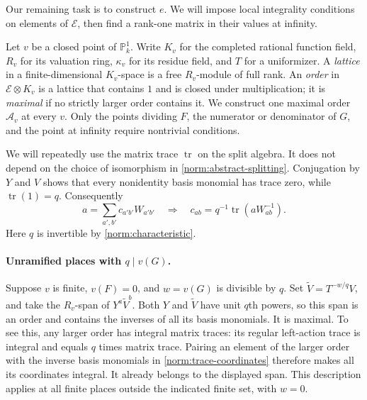 Our remaining task is to construct $e$.  We will impose local
integrality conditions on elements of $\mathcal E$, then find a
rank-one matrix in their values at infinity.

Let $v$ be a closed point of $\mathbb P^1_k$.  Write $K_v$ for the
completed rational function field, $R_v$ for its valuation ring,
$\kappa_v$ for its residue field, and $T$ for a uniformizer.  A
\emph{lattice} in a finite-dimensional $K_v$-space is a free $R_v$-module
of full rank.  An \emph{order} in $\mathcal E\otimes K_v$ is a lattice
that contains $1$ and is closed under multiplication; it is
\emph{maximal} if no strictly larger order contains it.  We construct
one maximal order $\mathcal A_v$ at every $v$.  Only the points dividing
$F$, the numerator or denominator of $G$, and the point at infinity
require nontrivial conditions.

We will repeatedly use the matrix trace $\operatorname{tr}$ on the
split algebra.  It does not depend on the choice of isomorphism in
\eqref{norm:abstract-splitting}.  Conjugation by $Y$ and $V$ shows that
every nonidentity basis monomial has trace zero, while
$\operatorname{tr}(1)=q$.  Consequently
\begin{equation}\label{norm:trace-coordinates}
 a=\sum_{a',b'} c_{a'b'}W_{a'b'}
 \quad\Longrightarrow\quad
 c_{ab}=q^{-1}\operatorname{tr}(aW_{ab}^{-1}).
\end{equation}
Here $q$ is invertible by \eqref{norm:characteristic}.

\paragraph{Unramified places with $q\mid v(G)$.}
Suppose $v$ is finite, $v(F)=0$, and $w=v(G)$ is divisible by $q$.
Set $\widetilde V=T^{-w/q}V$, and take the $R_v$-span of
$Y^a\widetilde V^b$.  Both $Y$ and $\widetilde V$ have unit $q$th
powers, so this span is an order and contains the inverses of all its
basis monomials.  It is maximal.  To see this, any larger order has
integral matrix traces: its regular left-action trace is integral and
equals $q$ times matrix trace.  Pairing an element of the larger order
with the inverse basis monomials in
\eqref{norm:trace-coordinates} therefore makes all its coordinates
integral.  It already belongs to the displayed span.  This description
applies at all finite places outside the indicated finite set, with
$w=0$.

